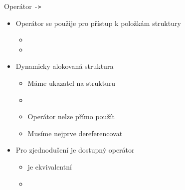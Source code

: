 \begin{frame}{Operátor \texttt{->}}

  \begin{itemize}
    \item Operátor  se použije pro přístup k položkám struktury
    \begin{itemize}
      \item {}
      \item {}
    \end{itemize}

    \pause

    \item Dynamicky alokovaná struktura
    \begin{itemize}
      \item Máme ukazatel na strukturu
      \item {}

      \pause

      \item Operátor  nelze přímo použít
      \item Musíme nejprve dereferencovat 
    \end{itemize}

    \pause

    \item Pro zjednodušení je dostupný operátor \code{\->}
    \begin{itemize}
      \item {} je ekvivalentní 
      \item {}
    \end{itemize}

  \end{itemize}

\end{frame}

